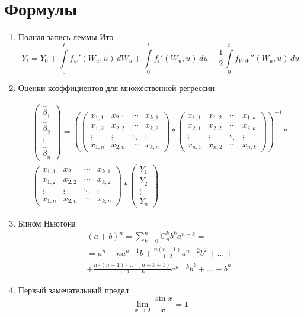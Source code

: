 \documentclass[12pt, a4paper]{article}
\begin{document}
\section{Формулы}
\begin{enumerate}
\item Полная запись леммы Ито \[ Y_t = Y_0+\int\limits_0^t f_w'(W_u,u)\,dW_u+\int\limits_0^t f_t'(W_u,u)\,du+\frac{1}{2} \int\limits_0^t f_{WW}''(W_u,u)\,du \tag{æ}\label{1} \] 
\item Оценки коэффициентов для множественной регрессии
\def \b{\hat{\beta}}
 \def \B { 
 \begin{pmatrix}
 \b_1 \\ \b_2 \\ \vdots \\ \b_n
 \end{pmatrix}}
 
 \def \x {
 \begin{pmatrix}
  x_{1,1} & x_{1,2} & \cdots & x_{1,k} \\
  x_{2,1} & x_{2,2} & \cdots & x_{2,k} \\
  \vdots  & \vdots  & \ddots & \vdots  \\
  x_{n,1} & x_{n,2} & \cdots & x_{n,k}
 \end{pmatrix}}

\def \X'{ 
 \begin{pmatrix}
  x_{1,1} & x_{2,1} & \cdots & x_{k,1} \\
  x_{1,2} & x_{2,2} & \cdots & x_{k,2} \\
  \vdots  & \vdots  & \ddots & \vdots  \\
  x_{1,n} & x_{2,n} & \cdots & x_{k,n}
 \end{pmatrix}}
 
\def \Y {  
 \begin{pmatrix}
 Y_1 \\ Y_2 \\ \vdots \\ Y_n
 \end{pmatrix}}
 \begin{align*}
  \B= \left(\X'* \x \right)^{-1} * \\
  \X'* \Y \tag{ææ}\label{2} 
\end{align*}

\item Бином Ньютона 
\begin{multline*}
(a+b)^n = \sum_{k=0}^{n} C^k_n b^k a^{n-k}=\\
=a^n+na^{n-1}b+\frac{n(n-1)}{1 \cdot 2}a^{n-2}b^2+\ldots+\\
+\frac{n \cdot (n-1)\cdot \ldots \cdot(n+k+1)}{1 \cdot 2 \cdot \ldots \cdot k}a^{n-k}b^k+ \ldots+b^n \tag{æææ}\label{3} 
\end{multline*}
\item Первый замечательный предел \[\lim_{x \to 0} \frac{\sin x}{x} = 1 \tag{ææææ}\label{4} \]


\end{enumerate}
\end{document}
